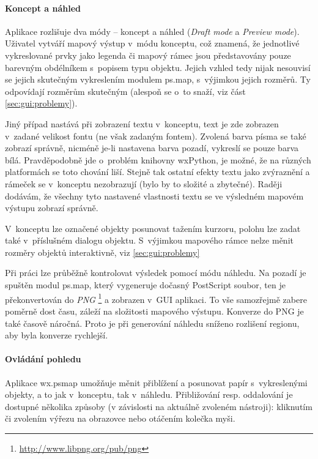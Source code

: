 \documentclass[a4paper,12pt,draft]{article}
\begin{document}
\paragraph*{Koncept a náhled}
Aplikace rozlišuje dva módy -- koncept a náhled (\emph{Draft mode}
a \emph{Preview mode}).
Uživatel vytváří mapový výstup v~módu konceptu, což znamená,
že jednotlivé vykreslované prvky jako legenda či mapový rámec jsou
představovány pouze barevným obdélníkem s~popisem typu objektu. Jejich
vzhled tedy nijak nesouvisí se jejich skutečným vykreslením modulem
ps.map, s~výjimkou jejich rozměrů. Ty odpovídají rozměrům
skutečným (alespoň se o~to snaží, viz část \ref{sec:gui:problemy}).

Jiný případ nastává při zobrazení textu v~konceptu, text je zde
zobrazen v~zadané velikost fontu (ne však zadaným fontem). Zvolená
barva písma se také zobrazí správně, nicméně je-li nastavena barva
pozadí, vykreslí se pouze barva bílá. Pravděpodobně jde o~problém
knihovny wxPython, je možné, že na různých platformách se toto chování
liší. Stejně tak ostatní efekty textu jako zvýraz\-nění a rámeček
se v~konceptu nezobrazují (bylo by to složité a zbytečné). Raději
dodávám, že všechny tyto nastavené vlastnosti textu se ve výsledném
mapovém výstupu zobrazí správně.

V~konceptu lze označené objekty posunovat tažením kurzoru, polohu lze
zadat také v~příslušném dialogu objektu. S~výjimkou mapového rámce
nelze měnit rozměry objektů interaktivně, viz \ref{sec:gui:problemy}

Při práci lze průběžně kontrolovat výsledek pomocí módu náhledu. Na
pozadí je spuštěn modul ps.map, který vygeneruje dočasný
PostScript soubor, ten je pře\-konvertován do \emph{PNG}%
\footnote{\url{http://www.libpng.org/pub/png}}
a zobrazen v~GUI
aplikaci. To vše samozřejmě zabere po\-měrně dost času, záleží na
složitosti mapového výstupu. Konverze do PNG je také časově
náročná. Proto je při generování náhledu sníženo rozlišení regionu, aby byla
konverze rychlejší.

\paragraph*{Ovládání pohledu}
Aplikace wx.psmap umožňuje měnit přiblížení a posunovat papír
s~vykreslenými objekty, a to jak v~konceptu, tak v~náhledu. Přibližování
resp. oddalování je dostupné několika způsoby (v závislosti na aktuálně zvoleném
nástroji): kliknutím či zvolením výřezu na obrazovce nebo otáčením kolečka myši.
\end{document}
